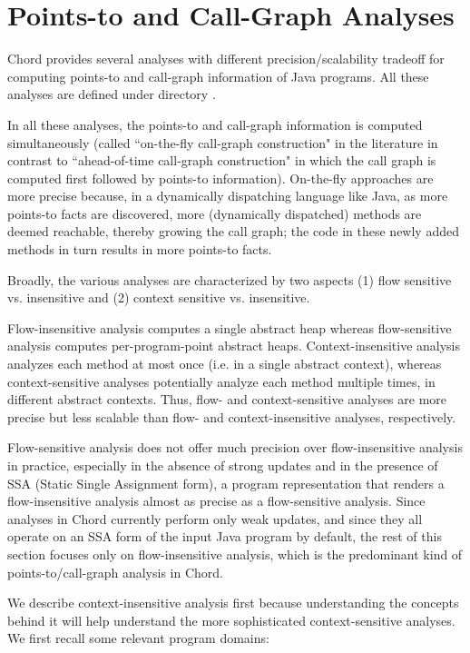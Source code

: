 \section{Points-to and Call-Graph Analyses}

Chord provides several analyses with different precision/scalability tradeoff for
computing points-to and call-graph information of Java programs.  All these
analyses are defined under directory .

In all these analyses, the points-to and call-graph information is computed
simultaneously (called ``on-the-fly call-graph construction" in the literature
in contrast to ``ahead-of-time call-graph construction" in which the call graph
is computed first followed by points-to information).  On-the-fly approaches are
more precise because, in a dynamically dispatching language like Java, as more
points-to facts are discovered, more (dynamically dispatched) methods are deemed
reachable, thereby growing the call graph; the code in these newly added methods
in turn results in more points-to facts.

Broadly, the various analyses are characterized by two aspects (1) flow
sensitive vs. insensitive and (2) context sensitive vs. insensitive.

Flow-insensitive analysis computes a single abstract heap whereas flow-sensitive
analysis computes per-program-point abstract heaps.  Context-insensitive
analysis analyzes each method at most once (i.e. in a single abstract context),
whereas context-sensitive analyses potentially analyze each method multiple
times, in different abstract contexts.  Thus, flow- and context-sensitive
analyses are more precise but less scalable than flow- and context-insensitive
analyses, respectively.

Flow-sensitive analysis does not offer much precision over flow-insensitive
analysis in practice, especially in the absence of strong updates and in the
presence of SSA (Static Single Assignment form), a program representation that
renders a flow-insensitive analysis almost as precise as a flow-sensitive
analysis.  Since analyses in Chord currently perform only weak updates, and
since they all operate on an SSA form of the input Java program by default, the
rest of this section focuses only on flow-insensitive analysis, which is the
predominant kind of points-to/call-graph analysis in Chord.

We describe context-insensitive analysis first because understanding the
concepts behind it will help understand the more sophisticated context-sensitive
analyses.  We first recall some relevant program domains:

